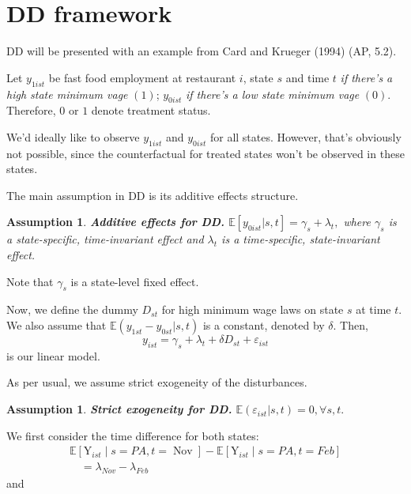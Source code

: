 \documentclass[11pt, a4paper]{report}
\theoremstyle{plain}
\newtheorem{assump}[thm]{Assumption}
\theoremstyle{plain}
\theoremstyle{remark}
\begin{document}
\section{DD framework}
DD will be presented with an example from Card and Krueger (1994) (AP, 5.2). 

Let $y_{1ist}$ be fast food employment at restaurant $i$, state $s$ and time $t$ \textit{if there's a high state minimum vage} $(1)$; $y_{0ist}$ \textit{if there's a low state minimum vage} $(0)$. Therefore, $0$ or $1$ denote treatment status. 

We'd ideally like to observe $y_{1ist}$ and $y_{0ist}$ for all states. However, that's obviously not possible, since the counterfactual for treated states won't be observed in these states. 

The main assumption in DD is its additive effects structure.
\begin{assump}
    \textbf{Additive effects for DD.} $\mathbb{E}[y_{0ist}|s,t] = \gamma_s + \lambda_t,$
    where $\gamma_s$ is a \textit{state-specific, time-invariant} effect and $\lambda_t$ is a \textit{time-specific, state-invariant} effect. 
\end{assump}
Note that $\gamma_s$ is a state-level fixed effect.



Now, we define the dummy $D_{st}$ for high minimum wage laws on state $s$ at time $t$. We also assume that $\mathbb{E}({y}_{1 s t} -  {y}_{0 s t} |s,t)$ is a constant, denoted by $\delta$. Then,
\begin{equation}
    {y}_{i s t}=\gamma_{s}+\lambda_{t}+\delta {D}_{s t}+\varepsilon_{i s t} 
    \end{equation}
is our linear model. 

As per usual, we assume strict exogeneity of the disturbances.
\begin{assump}
    \textbf{Strict exogeneity for DD.} $\mathbb{E}(\varepsilon_{ist} | s,t) = 0, \forall s,t.$
\end{assump}



We first consider the time difference for both states:
\begin{equation}
    \begin{array}{l}
    \mathbb{E}\left[\mathrm{Y}_{i s t} \mid s=P A, t=\operatorname{Nov}\right]-\mathbb{E}\left[\mathrm{Y}_{i s t} \mid s=P A, t=F e b\right] \\
    \quad=\lambda_{N o v}-\lambda_{F e b}
    \end{array}
    \end{equation}
and
\end{document}
